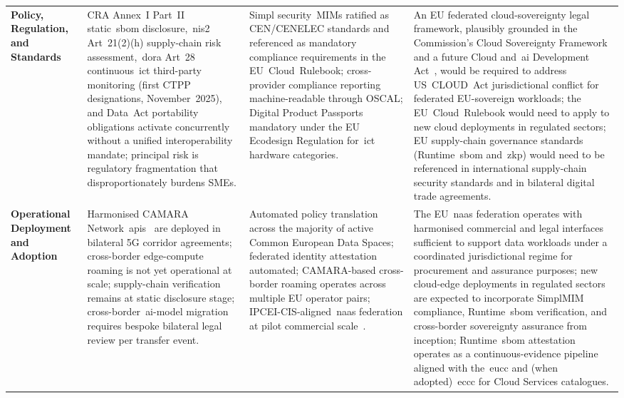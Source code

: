 \documentclass{ieeeaccess}
\begin{document}
\begin{table}[ht!]
\begin{tabularx}{\textwidth}{@{}>{\bfseries}p{} X X X@{}}
\addlinespace[2pt]
Policy, Regulation, and Standards &
CRA Annex~I Part~II static~\gls{sbom} disclosure,~\gls{nis2} Art~21(2)(h) supply-chain risk assessment,~\gls{dora} Art~28 continuous~\gls{ict} third-party monitoring (first CTPP designations, November~2025), and Data~Act portability obligations activate concurrently without a unified interoperability mandate; principal risk is regulatory fragmentation that disproportionately burdens SMEs. &
Simpl security~MIMs ratified as CEN/CENELEC standards and referenced as mandatory compliance requirements in the EU~Cloud~Rulebook; cross-provider compliance reporting machine-readable through OSCAL; Digital Product Passports mandatory under the EU Ecodesign Regulation for~\gls{ict} hardware categories. &
An EU federated cloud-sovereignty legal framework, plausibly grounded in the Commission's Cloud Sovereignty Framework and a future Cloud and~\gls{ai} Development Act~\cite{ec2025cloudsov}, would be required to address US~CLOUD~Act jurisdictional conflict for federated EU-sovereign workloads; the EU~Cloud~Rulebook would need to apply to new cloud deployments in regulated sectors; EU supply-chain governance standards (Runtime~\acrshort{sbom} and~\gls{zkp}) would need to be referenced in international supply-chain security standards and in bilateral digital trade agreements. \\
\addlinespace[2pt]
Operational Deployment and Adoption &
Harmonised CAMARA Network~\glspl{api}~\cite{gsmaopengateway2026} are deployed in bilateral 5G corridor agreements; cross-border edge-compute roaming is not yet operational at scale; supply-chain verification remains at static disclosure stage; cross-border~\gls{ai}-model migration requires bespoke bilateral legal review per transfer event. &
Automated policy translation across the majority of active Common European Data Spaces; federated identity attestation automated; CAMARA-based cross-border roaming operates across multiple EU operator pairs; IPCEI-CIS-aligned~\gls{naas} federation at pilot commercial scale~\cite{ipceicis2023}. &
The EU~\gls{naas} federation operates with harmonised commercial and legal interfaces sufficient to support data workloads under a coordinated jurisdictional regime for procurement and assurance purposes; new cloud-edge deployments in regulated sectors are expected to incorporate SimplMIM compliance, Runtime~\acrshort{sbom} verification, and cross-border sovereignty assurance from inception; Runtime~\gls{sbom} attestation operates as a continuous-evidence pipeline aligned with the~\gls{eucc} and (when adopted)~\gls{eccc} for Cloud Services catalogues.\\

\end{tabularx}
\end{table}
\end{document}
